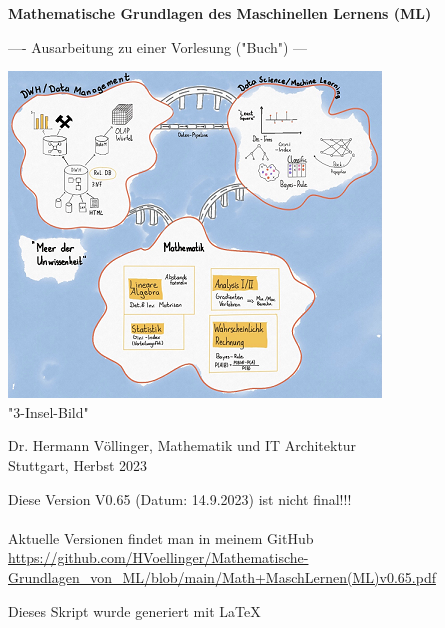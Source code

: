 \documentclass[12pt]{article}
\begin{document}

\begin{titlepage}
   \begin{center}
   \LARGE  
   \vspace{1.0cm}
       
   \textbf{Mathematische Grundlagen des Maschinellen Lernens (ML)}

   \vspace{1.0cm}
  
   \large       
   ---- Ausarbeitung zu einer Vorlesung ("Buch") ---
       
   
   \vspace{1.0cm}
   
   \includegraphics{DWH-Zeichnung}\\
   \small "3-Insel-Bild"  
       
   \vfill
   \large   
   
   Dr. Hermann Völlinger, Mathematik und IT Architektur
           \\ Stuttgart, Herbst 2023     

   \vspace{0.6cm}
        
   \end{center}
   
\begin{center}
Diese Version V0.65 (Datum: 14.9.2023) ist nicht final!!! \\
{\color{red}{(Beachte: ************ Kommentare *********)}} \\[0.3cm]
Aktuelle Versionen findet man in meinem GitHub\\[0.1cm]
\url{https://github.com/HVoellinger/Mathematische-Grundlagen_von_ML/blob/main/Math+MaschLernen(ML)v0.65.pdf} \\
\vspace{0.4cm}
\begin{large}
Dieses Skript wurde generiert mit \LaTeX\  
\end{large}
\end{center}


\end{titlepage}
\end{document}
